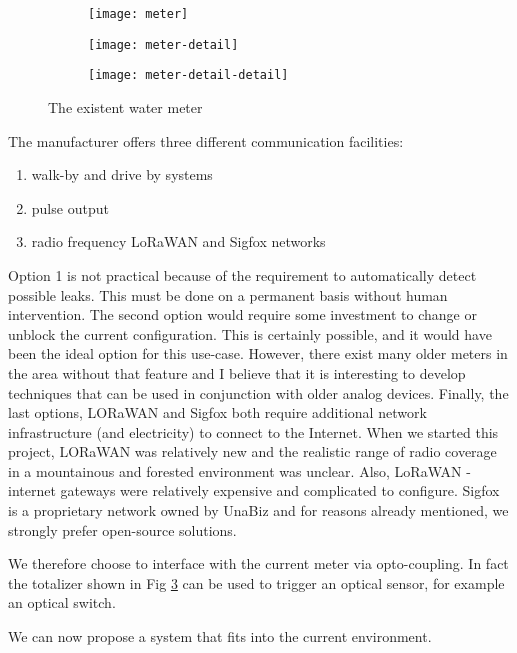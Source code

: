 \begin{figure}[h]
    \centering
    \begin{subfigure}[b]{0.3\textwidth}
        \centering
        \texttt{[image: meter]}
        \label{fig:wwm}
    \end{subfigure}
    \hfill
    \begin{subfigure}[b]{0.3\textwidth}
        \centering
        \texttt{[image: meter-detail]}
        \label{fig:tot}
    \end{subfigure}
    \hfill
    \begin{subfigure}[b]{0.3\textwidth}
        \centering
        \texttt{[image: meter-detail-detail]}
        \label{fig:totd}
    \end{subfigure}
    \caption{The existent water meter}
    \label{fig:ewm}
\end{figure}

The manufacturer offers three different communication facilities:
\begin{enumerate}
    \item walk-by and drive by systems
    \item pulse output
    \item radio frequency LoRaWAN and Sigfox networks
\end{enumerate}


Option 1 is not practical because of the requirement to automatically detect possible leaks.
This must be done on a permanent basis without human intervention. The second option would require some investment to
change or unblock the current configuration. This is certainly possible, and it would have been the ideal option
for this use-case. However, there exist many older meters in the area without that feature and I believe that
it is interesting to develop techniques that can be used in conjunction with older analog devices.
Finally, the last options, LORaWAN and Sigfox both require additional network infrastructure (and electricity) to connect to
the Internet. When we started this project, LORaWAN was relatively new and the realistic range of radio coverage
in a mountainous and forested environment was unclear. Also, LoRaWAN - internet gateways were relatively expensive and
complicated to configure. Sigfox is a proprietary network owned by UnaBiz and for reasons already mentioned, we
strongly prefer open-source solutions.


We therefore choose to interface with the current meter via opto-coupling. In fact the totalizer shown in Fig \ref{fig:totd}
can be used to trigger an optical sensor, for example an optical switch.

We can now propose a system that fits into the current environment.

